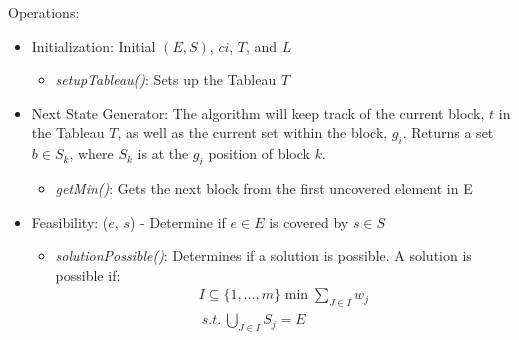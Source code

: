 \documentclass[12pt]{article}
\begin{document}
Operations:
\begin{itemize}
	\item Initialization: Initial $(E, S)$, $ci$, $T$, and $L$
		\begin{itemize}
			\item \textit{setupTableau()}: Sets up the Tableau $T$
		\end{itemize}
	\item Next State Generator: The algorithm will keep track of the current block, $t$ in the Tableau $T$, as well as the current set within the block, $g_i$. Returns a set $b \in S_k$, where $S_k$ is at the $g_i$ position of block $k$.
		\begin{itemize}
			\item \textit{getMin()}: Gets the next block from the first uncovered element in E
		\end{itemize}
	\item Feasibility: ($e$, $s$) - Determine if $e \in E$ is covered by $s \in S$ 
			\begin{itemize}
				\item \textit{solutionPossible()}: Determines if a solution is possible. A solution is possible if: \begin{align*}
				I \subseteq \{1,...,m\} \min \sum_{J \in I} w_j \\
				\:s.t.\: \bigcup_{J \in I} S_j = E
				\end{align*}
				

\end{itemize}
\end{itemize}
\end{document}
